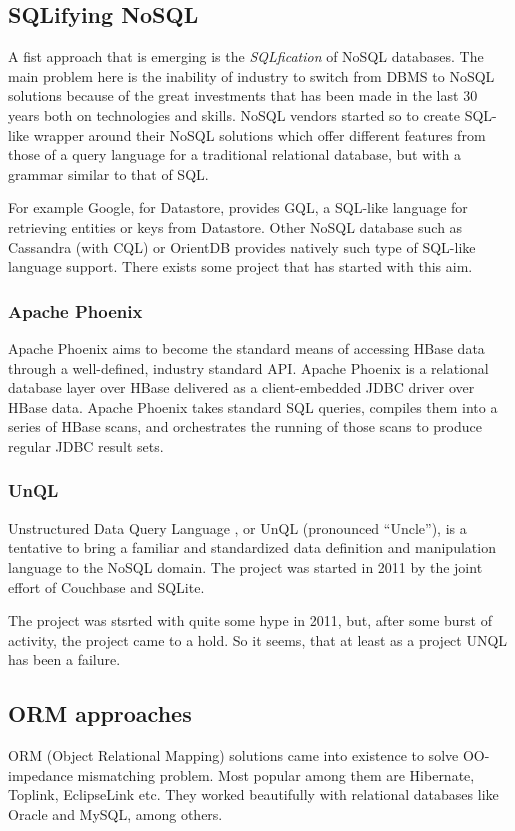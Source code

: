 \subsection{SQLifying NoSQL}
A fist approach that is emerging is the \textit{SQLfication} of NoSQL databases.
The main problem here is the inability of industry to switch from DBMS to NoSQL solutions because of the great investments that has been made in the last 30 years both on technologies and skills.
NoSQL vendors started so to create SQL-like wrapper around their NoSQL solutions which offer different features from those of a query language for a traditional relational database, but with a grammar similar to that of SQL.

\noindent For example Google, for Datastore, provides GQL, a SQL-like language for retrieving entities or keys from Datastore.
Other NoSQL database such as Cassandra (with CQL) or OrientDB provides natively such type of SQL-like language support.
There exists some project that has started with this aim.

\subsubsection{Apache Phoenix} 
Apache Phoenix \cite{online:apache-phoenix} aims to become the standard means of accessing HBase data through a well-defined, industry standard API.
Apache Phoenix is a relational database layer over HBase delivered as a client-embedded JDBC driver over HBase data. Apache Phoenix takes standard SQL queries, compiles them into a series of HBase scans, and orchestrates the running of those scans to produce regular JDBC result sets. 

\subsubsection{UnQL}  
Unstructured Data Query Language \cite{online:unql}, or UnQL (pronounced “Uncle”), is a tentative to bring a familiar and standardized data definition and manipulation language to the NoSQL domain. The project was started in 2011 by the joint effort of Couchbase and SQLite.

\noindent The project was stsrted with quite some hype in 2011, but, after some burst of activity, the project came to a hold. So it seems, that at least as a project UNQL has been a failure. 

\subsection{ORM approaches}
ORM (Object Relational Mapping) solutions came into existence to solve OO-impedance mismatching problem. Most popular among them are Hibernate, Toplink, EclipseLink etc. They worked beautifully with relational databases like Oracle and MySQL, among others.

